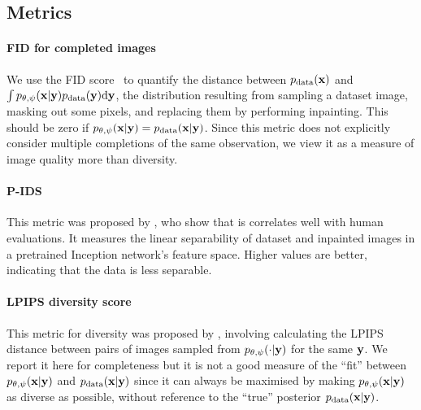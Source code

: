 \subsection{Metrics} \label{supp:cigcvae-metrics}
\paragraph{FID for completed images}
We use the FID score~\citep{heusel2017gans} to quantify the distance between
$p_{\rm{data}} ({\mathbf{x}})$ and $\int p_{\theta,\psi}({\mathbf{x}}|{\mathbf{y}}) p_{\rm{data}} ({\mathbf{y}})
\mathrm{d}{\mathbf{y}}$, the distribution resulting from sampling a dataset image,
masking out some pixels, and replacing them by performing inpainting. This
should be zero if $p_{\theta,\psi}({\mathbf{x}}|{\mathbf{y}}) = p_{\rm{data}} ({\mathbf{x}}|{\mathbf{y}})$. Since
this metric does not explicitly consider multiple completions of the same
observation, we view it as a measure of image quality more than diversity.

\paragraph{P-IDS}
This metric was proposed by \citet{zhao2021large}, who show that is correlates
well with human evaluations. It measures the linear separability of dataset and
inpainted images in a pretrained Inception network's feature space. Higher
values are better, indicating that the data is less separable.
%

\paragraph{LPIPS diversity score}
This metric for diversity was proposed by \citet{zhu2017toward}, involving
calculating the LPIPS distance between pairs of images sampled from
$p_{\theta,\psi}(\cdot|{\mathbf{y}})$ for the same ${\mathbf{y}}$. We report it here for
completeness but it is not a good measure of the ``fit'' between
$p_{\theta,\psi}({\mathbf{x}}|{\mathbf{y}})$ and $p_{\rm{data}} ({\mathbf{x}}|{\mathbf{y}})$ since it can always be
maximised by making $p_{\theta,\psi}({\mathbf{x}}|{\mathbf{y}})$ as diverse as possible, without
reference to the ``true'' posterior $p_{\rm{data}} ({\mathbf{x}}|{\mathbf{y}})$.

